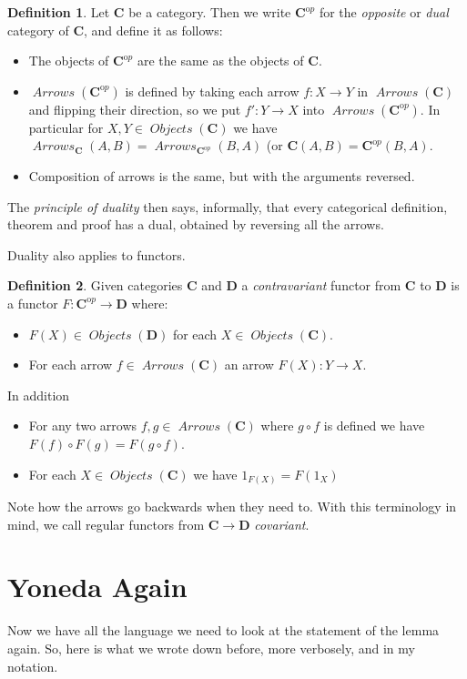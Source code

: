 \documentclass[12pt]{article}
\theoremstyle{definition}
\theoremstyle{definition}
\newtheorem{defn}{Definition}[]
\theoremstyle{definition}
\numberwithin{equation}{section}
\newcommand{\cat}[1]{\mathbf{#1}}      %
\newcommand{\CC}{\cat{C}}
\newcommand{\CCop}{\cat{C}^{\mathrm op}}
\newcommand{\DD}{\cat{D}}
\DeclareMathOperator{\Arrows}{\mathit{Arrows}}
\DeclareMathOperator{\Objects}{\mathit{Objects}}
\def\objc{\Objects(\cat{C})}
\def\ni{\goodbreak\noindent}
\begin{document}
\begin{defn}
Let $\CC$ be a category. Then we write $\CCop$ for the {\it opposite} or {\it dual}
category of $\CC$, and define it as follows:
\begin{itemize}
\item The objects of $\CCop$ are the same as the objects of $\CC$.
\item $\Arrows(\CCop)$ is defined by taking each arrow $f :X \to Y$ in $\Arrows(\CC)$ and
flipping their direction, so we put $f': Y \to X$ into $\Arrows(\CCop)$. In particular for
$X, Y \in \Objects(\CC)$ we have $\Arrows_{\CC}(A, B) = \Arrows_{\CCop}(B, A)$ (or $\CC(A,
B) = \CCop(B, A)$.
\item Composition of arrows is the same, but with the arguments reversed.
\end{itemize}
\end{defn}
\ni
The {\it principle of duality} then says, informally, that every categorical definition,
theorem and proof has a dual, obtained by reversing all the arrows.

Duality also applies to functors.

\begin{defn}
Given categories $\CC$ and $\DD$ a {\it contravariant} functor from $\CC$ to $\DD$ is a
functor $F: \CCop \to \DD$ where:
\begin{itemize}
\item $F(X) \in \Objects(\DD)$ for each $X \in \objc$.
\item For each arrow $f \in \Arrows(\CC)$ an arrow $F(X): Y \to X$.
\end{itemize}
\goodbreak
\ni
In addition
\begin{itemize}
\item For any two arrows $f, g \in \Arrows(\CC)$ where $g \circ f$ is defined we have
$F(f) \circ F(g) = F(g \circ f)$.
\item For each $X \in \Objects(\CC)$ we have $1_{F(X)} = F(1_X)$
\end{itemize}

\end{defn}
\noindent
Note how the arrows go backwards when they need to. With this terminology in mind, we call
regular functors from $\CC \to \DD$ {\it covariant}.

\section{Yoneda Again}

Now we have all the language we need to look at the statement of the lemma again.
So, here is what we wrote down before, more verbosely, and in my notation.
\end{document}
